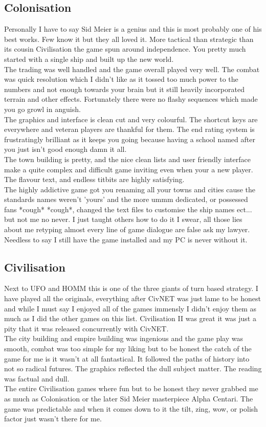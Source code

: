 \documentclass[a4paper]{article}
\begin{document}
\subsection{Colonisation}
Personally I have to say Sid Meier is a genius and this is most probably one of his best works. Few know it but they all loved it. More tactical than strategic than its cousin Civilisation the game spun around independence. You pretty much started with a single ship and built up the new world.\\
The trading was well handled and the game overall played very well. The combat was quick resolution which I didn't like as it tossed too much power to the numbers and not enough towards your brain but it still heavily incorporated terrain and other effects. Fortunately there were no flashy sequences which made you go growl in anguish.\\
The graphics and interface is clean cut and very colourful. The shortcut keys are everywhere and veteran players are thankful for them. The end rating system is frustratingly brilliant as it keeps you going because having a school named after you just isn't good enough damn it all.\\
The town building is pretty, and the nice clean lists and user friendly interface make a quite complex and difficult game inviting even when your a new player. The flavour text, and endless titbits are highly satisfying.\\
The highly addictive game got you renaming all your towns and cities cause the standards names weren't 'yours' and the more ummm dedicated, or possessed fans *cough* *cough*, changed the text files to customise the ship names ect... but not me no never. I just taught others how to do it I swear, all those lies about me retyping almost every line of game dialogue are false ask my lawyer. Needless to say I still have the game installed and my PC is never without it.

\subsection{Civilisation}
Next to UFO and HOMM this is one of the three giants of turn based strategy. I have played all the originals, everything after CivNET was just lame to be honest and while I must say I enjoyed all of the games immensly I didn't enjoy them as much as I did the other games on this list. Civilisation II was great it was just a pity that it was released concurrently with CivNET.\\
The city building and empire building was ingenious and the game play was smooth, combat was too simple for my liking but to be honest the catch of the game for me is it wasn't at all fantastical. It followed the paths of history into not so radical futures. The graphics reflected the dull subject matter. The reading was factual and dull.\\
The entire Civilisation games where fun but to be honest they never grabbed me as much as Colonisation or the later Sid Meier masterpiece Alpha Centari. The game was predictable and when it comes down to it the tilt, zing, wow, or polish factor just wasn't there for me.
\end{document}

